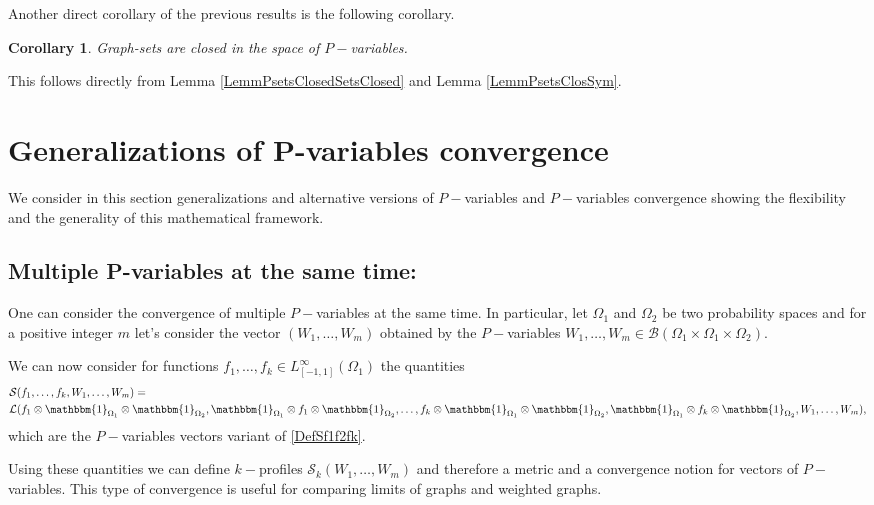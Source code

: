 \documentclass[11pt]{article}
\newtheorem{corollary}{Corollary}[theorem]
\newcommand{\cB}{{\mathcal B}}  %
\newcommand{\cS}{{\mathcal S}}  %
\begin{document}
Another direct corollary of the previous results is the following corollary.

\begin{corollary}
Graph-sets are closed in the space of $P-$variables.
\end{corollary}
\proof
This follows directly from Lemma \ref{LemmPsetsClosedSetsClosed} and Lemma \ref{LemmPsetsClosSym}.
\endproof



\section{Generalizations of P-variables convergence}\label{Sec8GeneralizationsAndDirect}

We consider in this section generalizations and alternative versions of $P-$variables and $P-$variables convergence showing the flexibility and the generality of this mathematical framework. 
\subsection{Multiple P-variables at the same time:}

One can consider the convergence of multiple $P-$variables at the same time. In particular, let $\Omega_1$ and $\Omega_2$ be two probability spaces and for a positive integer $m$ let's consider the vector $(W_1,\ldots,W_m)$ obtained by the $P-$variables $W_1,\ldots,W_m\in \cB(\Omega_1\times \Omega_1\times \Omega_2).$ 

We can now consider for functions $f_1,\ldots , f_k \in L_{[-1,1]}^{\infty}(\Omega_1)$ the quantities
$$
\begin{aligned}&\cS(f_{1},\ldots, f_{k},W_1,\ldots ,W_m)=\\
&\mathcal{L}(f_{1} \otimes\mathbbm{1}_{\Omega_1} \otimes \mathbbm{1}_{\Omega_2},\mathbbm{1}_{\Omega_1}\otimes f_{1} \otimes\mathbbm{1}_{\Omega_2},\ldots, f_{k} \otimes\mathbbm{1}_{\Omega_1} \otimes \mathbbm{1}_{\Omega_2},\mathbbm{1}_{\Omega_1}\otimes f_{k} \otimes\mathbbm{1}_{\Omega_2},W_1,\ldots ,W_m),
\end{aligned}$$
which are the $P-$variables vectors variant of \ref{DefSf1f2fk}.

Using these quantities we can define $k-$profiles $\cS_k(W_1,\ldots,W_m)$ and therefore a metric and a convergence notion for vectors of $P-$variables. This type of convergence is useful for comparing limits of graphs and weighted graphs.
\end{document}
